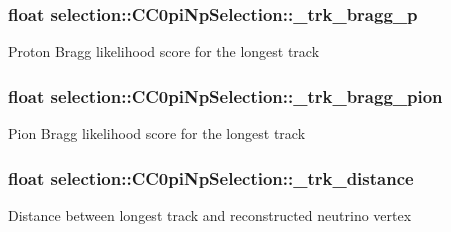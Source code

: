 \subsubsection[{\texorpdfstring{\+\_\+trk\+\_\+bragg\+\_\+p}{_trk_bragg_p}}]{\setlength{\rightskip}{0pt plus 5cm}float selection\+::\+C\+C0pi\+Np\+Selection\+::\+\_\+trk\+\_\+bragg\+\_\+p\hspace{0.3cm}{\ttfamily [private]}}\hypertarget{classselection_1_1CC0piNpSelection_a52d578481ee7dd4fed45f8e3c8ed44da}{}\label{classselection_1_1CC0piNpSelection_a52d578481ee7dd4fed45f8e3c8ed44da}
Proton Bragg likelihood score for the longest track 
\subsubsection[{\texorpdfstring{\+\_\+trk\+\_\+bragg\+\_\+pion}{_trk_bragg_pion}}]{\setlength{\rightskip}{0pt plus 5cm}float selection\+::\+C\+C0pi\+Np\+Selection\+::\+\_\+trk\+\_\+bragg\+\_\+pion\hspace{0.3cm}{\ttfamily [private]}}\hypertarget{classselection_1_1CC0piNpSelection_a5371981bb5f02024c2ba1d986541ffd9}{}\label{classselection_1_1CC0piNpSelection_a5371981bb5f02024c2ba1d986541ffd9}
Pion Bragg likelihood score for the longest track 
\subsubsection[{\texorpdfstring{\+\_\+trk\+\_\+distance}{_trk_distance}}]{\setlength{\rightskip}{0pt plus 5cm}float selection\+::\+C\+C0pi\+Np\+Selection\+::\+\_\+trk\+\_\+distance\hspace{0.3cm}{\ttfamily [private]}}\hypertarget{classselection_1_1CC0piNpSelection_a0f16777192fbed04bcc67edfdfa67e6b}{}\label{classselection_1_1CC0piNpSelection_a0f16777192fbed04bcc67edfdfa67e6b}
Distance between longest track and reconstructed neutrino vertex 
